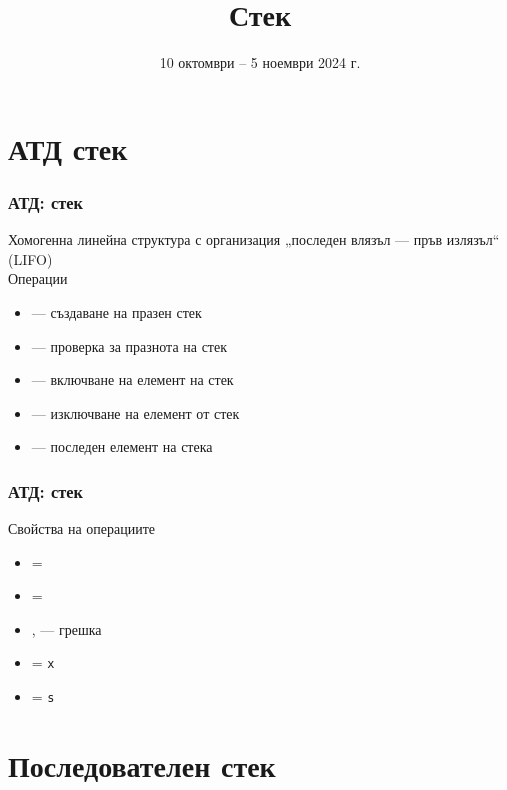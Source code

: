 \documentclass[alsotrans, beameroptions={aspectratio=169}]{beamerswitch}
\title{Стек}
\date[10.10–5.11.2024 г.]{10 октомври – 5 ноември 2024 г.}
\begin{document}
\begin{frame}
  \titlepage
\end{frame}

\section{АТД стек}

\begin{frame}
  \frametitle{АТД: стек}

  Хомогенна линейна структура с организация „последен влязъл --- пръв излязъл“ (LIFO)\\[2ex]
  Операции\\[1ex]
  \begin{itemize}
  \item {} --- създаване на празен стек
  \item {} --- проверка за празнота на стек
  \item {} --- включване на елемент на стек
  \item {} --- изключване на елемент от стек
  \item {} --- последен елемент на стека
  \end{itemize}
\end{frame}

\begin{frame}
  \frametitle{АТД: стек}

  Свойства на операциите\\[1ex]
  \begin{itemize}
  \item {} = 
  \item {} = 
  \item {},  --- \alert{грешка}
  \item {} = \tt x
  \item {} = \tt s
  \end{itemize}
\end{frame}

\section{Последователен стек}
\end{document}

